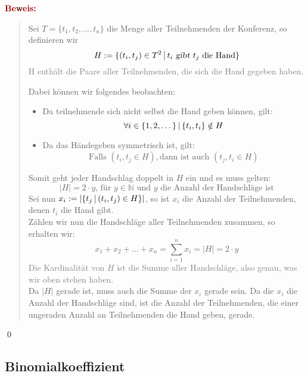 \documentclass{article}
\newcommand{\smsp}{\phantom{\hspace{3px}}}
\newcommand{\gray}[1]{\textcolor{gray}{#1}}
\newcommand{\maroon}[1]{\textcolor{maroon}{#1}}
\newcommand{\pr}[1]{\maroon{\textbf{Beweis: }}\begin{quote}#1\end{quote}\qed}
\newcommand{\N}{\mathbb{N}}
\newcommand{\vst}{\smsp \vline \smsp}
\begin{document}
\pr{
    Sei $T = \{t_1, t_2, \dots, t_n\}$ die Menge aller Teilnehmenden der Konferenz, so definieren wir
    \begin{equation*}
        H := \{(t_i, t_j) \in T^2 \vst t_i \textsl{ gibt } t_j \text{ die Hand}\}
    \end{equation*}
    \gray{H enthält die Paare aller Teilnehmenden, die sich die Hand gegeben haben.}

    Dabei können wir folgendes beobachten:
    \begin{itemize}
        \item Da teilnehmende sich nicht selbst die Hand geben können, gilt:
        \begin{equation*}
            \forall i \in \{1, 2, \dots\} \vst \{t_i, t_i\} \notin H
        \end{equation*}
        \item Da das Händegeben symmetrisch ist, gilt:
        \begin{equation*}
            \text{Falls } (t_i, t_j \in H), \text{dann ist auch } (t_j, t_i \in H)
        \end{equation*}
    \end{itemize}
    Somit geht jeder Handschlag doppelt in $H$ ein und es muss gelten:
    \begin{equation*}
        |H| = 2 \cdot y \text{, für } y \in \N \text{ und $y$ die Anzahl der Handschläge ist}
    \end{equation*}
    Sei nun $x_i := |\{t_j \vst (t_i, t_j) \in H\}|$, so ist $x_i$ die Anzahl der Teilnehmenden, denen $t_i$ die Hand gibt.\\
    Zählen wir nun die Handschläge aller Teilnehmenden zusammen, so erhalten wir:
    \begin{equation*}
        x_1 + x_2 + \dots + x_n = \sum_{i = 1}^n x_i = |H| = 2 \cdot y
    \end{equation*}
    \gray{Die Kardinalität von $H$ ist die Summe aller Handschläge, also genau, was wir oben stehen haben.}\\
    Da $|H|$ gerade ist, muss auch die Summe der $x_i$ gerade sein. Da die $x_i$ die Anzahl der Handschläge sind, ist die Anzahl der Teilnehmenden, die einer ungeraden Anzahl an Teilnehmenden die Hand geben, gerade.
}

\newpage

\subsection{Binomialkoeffizient}
\end{document}
